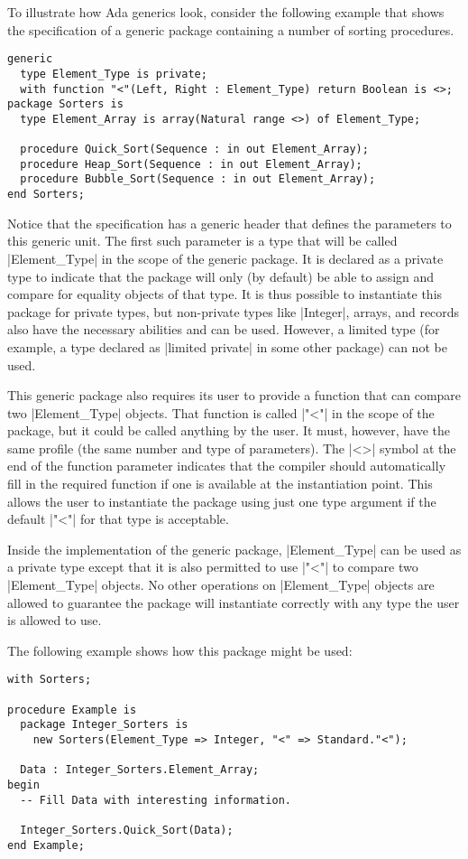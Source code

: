 To illustrate how Ada generics look, consider the following example that shows the specification
of a generic package containing a number of sorting procedures.

\begin{lstlisting}
generic
  type Element_Type is private;
  with function "<"(Left, Right : Element_Type) return Boolean is <>;
package Sorters is
  type Element_Array is array(Natural range <>) of Element_Type;

  procedure Quick_Sort(Sequence : in out Element_Array);
  procedure Heap_Sort(Sequence : in out Element_Array);
  procedure Bubble_Sort(Sequence : in out Element_Array);
end Sorters;
\end{lstlisting}

Notice that the specification has a generic header that defines the parameters to this generic
unit. The first such parameter is a type that will be called |Element_Type| in the scope of the
generic package. It is declared as a private type to indicate that the package will only (by
default) be able to assign and compare for equality objects of that type. It is thus possible to
instantiate this package for private types, but non-private types like |Integer|, arrays, and
records also have the necessary abilities and can be used. However, a limited type (for example,
a type declared as |limited private| in some other package) can not be used.

This generic package also requires its user to provide a function that can compare two
|Element_Type| objects. That function is called |"<"| in the scope of the package, but it could
be called anything by the user. It must, however, have the same profile (the same number and
type of parameters). The |<>| symbol at the end of the function parameter indicates that the
compiler should automatically fill in the required function if one is available at the
instantiation point. This allows the user to instantiate the package using just one type
argument if the default |"<"| for that type is acceptable.

Inside the implementation of the generic package, |Element_Type| can be used as a private type
except that it is also permitted to use |"<"| to compare two |Element_Type| objects. No other
operations on |Element_Type| objects are allowed to guarantee the package will instantiate
correctly with any type the user is allowed to use.

The following example shows how this package might be used:

\begin{lstlisting}
with Sorters;

procedure Example is
  package Integer_Sorters is
    new Sorters(Element_Type => Integer, "<" => Standard."<");

  Data : Integer_Sorters.Element_Array;
begin
  -- Fill Data with interesting information.

  Integer_Sorters.Quick_Sort(Data);
end Example;
\end{lstlisting}


